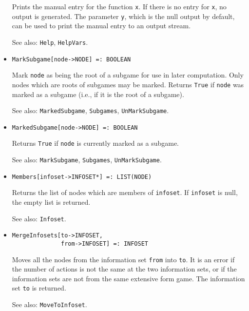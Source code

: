 \begin{itemize}
\bd 
Prints the manual entry for the function \verb+x+.  If there is no
entry for \verb+x+, no output is generated. The parameter
\verb+y+, which is the null output by default, can be used to print
the manual entry to an output stream.
\item [See also:] \verb+Help+, \verb+HelpVars+.
\ed

\item{}
\protect \large \begin{verbatim}
MarkSubgame[node->NODE] =: BOOLEAN 
\end{verbatim} \normalsize

\bd
Mark \verb+node+ as being the root of a subgame for use in later computation.
Only nodes which are roots of subgames may be marked.  Returns \verb+True+
if \verb+node+ was marked as a subgame (i.e., if it is the root of a subgame).
\item [See also:] \verb+MarkedSubgame+, \verb+Subgames+,
\verb+UnMarkSubgame+.
\ed


\item{}
\protect \large \begin{verbatim}
MarkedSubgame[node->NODE] =: BOOLEAN 
\end{verbatim} \normalsize

\bd
Returns \verb+True+ if \verb+node+ is currently marked as a subgame. 
\item [See also:] \verb+MarkSubgame+, \verb+Subgames+, \verb+UnMarkSubgame+.
\ed


\item{}
\protect \large \begin{verbatim}
Members[infoset->INFOSET*] =: LIST(NODE) 
\end{verbatim}\normalsize

\bd
Returns the list of nodes which are members of \verb+infoset+.  If
\verb+infoset+ is null, the empty list is returned.
\item [See also:] \verb+Infoset+.
\ed

\item{}
\protect \large \begin{verbatim}
MergeInfosets[to->INFOSET,
              from->INFOSET] =: INFOSET
\end{verbatim}\normalsize

\bd
Moves all the nodes from the information set \verb+from+ into \verb+to+.
It is an error if the number of actions is not the same at the
two information sets, or if the information sets are not from the
same extensive form game.  The information set \verb+to+ is returned.
\item [See also:] \verb+MoveToInfoset+.
\ed


\end{itemize}
